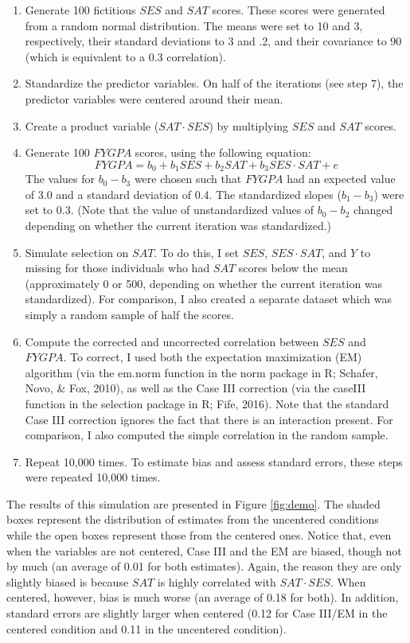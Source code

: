 \documentclass[english,man]{apa6}
\providecommand{\tightlist}{%
  \setlength{\itemsep}{0pt}\setlength{\parskip}{0pt}}
\theoremstyle{definition}
\theoremstyle{definition}
\theoremstyle{remark}
\begin{document}
\begin{enumerate}
\def\labelenumi{(\arabic{enumi})}
\tightlist
\item
  Generate 100 fictitious \(SES\) and \(SAT\) scores. These scores were
  generated from a random normal distribution. The means were set to 10
  and 3, respectively, their standard deviations to 3 and .2, and their
  covariance to 90 (which is equivalent to a 0.3 correlation).
\item
  Standardize the predictor variables. On half of the iterations (see
  step 7), the predictor variables were centered around their mean.
\item
  Create a product variable (\(SAT\cdot SES\)) by multiplying \(SES\)
  and \(SAT\) scores.
\item
  Generate 100 \(FYGPA\) scores, using the following equation:
  \[ FYGPA = b_0 + b_1SES + b_2SAT + b_3SES\cdot SAT + e\] The values
  for \(b_0-b_3\) were chosen such that \(FYGPA\) had an expected value
  of 3.0 and a standard deviation of 0.4. The standardized slopes
  (\(b_1-b_3\)) were set to 0.3. (Note that the value of unstandardized
  values of \(b_0-b_2\) changed depending on whether the current
  iteration was standardized.)
\item
  Simulate selection on \(SAT\). To do this, I set \(SES\),
  \(SES\cdot SAT\), and \(Y\) to missing for those individuals who had
  \(SAT\) scores below the mean (approximately 0 or 500, depending on
  whether the current iteration was standardized). For comparison, I
  also created a separate dataset which was simply a random sample of
  half the scores.
\item
  Compute the corrected and uncorrected correlation between \(SES\) and
  \(FYGPA\). To correct, I used both the expectation maximization (EM)
  algorithm (via the em.norm function in the norm package in R; Schafer,
  Novo, \& Fox, 2010), as well as the Case III correction (via the
  caseIII function in the selection package in R; Fife, 2016). Note that
  the standard Case III correction ignores the fact that there is an
  interaction present. For comparison, I also computed the simple
  correlation in the random sample.
\item
  Repeat 10,000 times. To estimate bias and assess standard errors,
  these steps were repeated 10,000 times.
\end{enumerate}

The results of this simulation are presented in Figure \ref{fig:demo}.
The shaded boxes represent the distribution of estimates from the
uncentered conditions while the open boxes represent those from the
centered ones. Notice that, even when the variables are not centered,
Case III and the EM are biased, though not by much (an average of 0.01
for both estimates). Again, the reason they are only slightly biased is
because \(SAT\) is highly correlated with \(SAT\cdot SES\). When
centered, however, bias is much worse (an average of 0.18 for both). In
addition, standard errors are slightly larger when centered (0.12 for
Case III/EM in the centered condition and 0.11 in the uncentered
condition).
\end{document}
